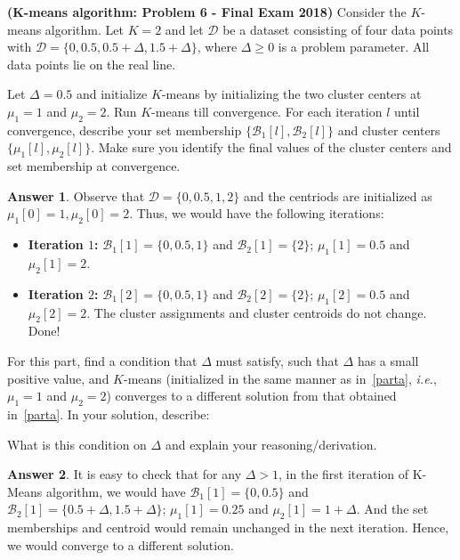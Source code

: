 \documentclass{article}
\theoremstyle{definition}
\newtheorem*{answer}{Answer}
\begin{document}
\begin{question}[start=1]
	\item \textbf{(K-means algorithm: Problem 6 - Final Exam 2018)} Consider the $K$-means algorithm. Let $K = 2$ and let $\mathcal{D}$ be a dataset consisting of four data points with $\mathcal{D} = \{0, 0.5, 0.5 + \Delta, 1.5 + \Delta\}$, where $\Delta \geq 0$ is a problem parameter. All data points lie on the real line.
	\begin{question}
		\item \label{parta}Let $\Delta = 0.5$ and initialize $K$-means by initializing the two cluster centers at $\mu_1 = 1$ and $\mu_2 = 2$. Run $K$-means till convergence. For each iteration $l$ until convergence, describe your set membership $\{\mathcal{B}_1[l], \mathcal{B}_2[l]\}$ and cluster centers $\{\mu_1[l], \mu_2[l]\}$. Make sure you identify the final values of the cluster centers and set membership at convergence.
		\begin{answer}
			Observe that  $\mathcal D = \{0, 0.5, 1, 2\}$ and the centriods are initialized as $\mu_1[0] = 1, \mu_2[0] = 2$. Thus, we would have the following iterations:
			\begin{itemize}
				\item \textbf{Iteration $1$:} $\mathcal{B}_{1}[1] = \{0, 0.5, 1\}$ and $\mathcal{B}_{2}[1] = \{2\}$; $\mu_{1}[1] = 0.5$ and $\mu_{2}[1] = 2$.
				\item \textbf{Iteration $2$:} $\mathcal{B}_{1}[2] = \{0, 0.5, 1\}$ and $\mathcal{B}_{2}[2] = \{2\}$; $\mu_{1}[2] = 0.5$ and $\mu_{2}[2] = 2$. The cluster assignments and cluster centroids do not change. Done!
			\end{itemize}
		\end{answer}
		\item For this part, find a condition that $\Delta$ must satisfy, such that $\Delta$ has a small positive value, and $K$-means (initialized in the same manner as in~\ref{parta}, \textit{i.e.}, $\mu_1 = 1$ and $\mu_2 = 2$) converges to a different solution from that obtained in~\ref{parta}. In your solution, describe:
		\begin{question}
			\item What is this condition on $\Delta$ and explain your reasoning/derivation.
			\begin{answer}
				It is easy to check that for any $\Delta > 1$, in the first iteration of K-Means algorithm, we would have  $\mathcal{B}_{1}[1] = \{0, 0.5\}$ and $\mathcal{B}_{2}[1] = \{0.5+\Delta, 1.5+\Delta\}$; $\mu_{1}[1] = 0.25$ and $\mu_{2}[1] = 1+\Delta$. And the set memberships and centroid would remain unchanged in the next iteration. Hence, we would converge to a different solution.\\
				

\end{answer}
\end{question}
\end{question}
\end{question}
\end{document}

